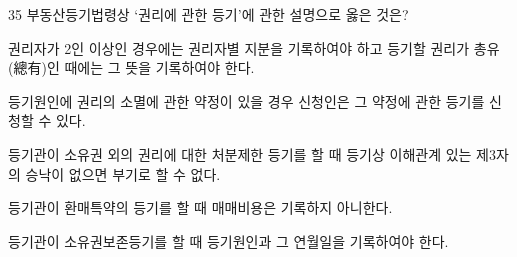 \begin{question}{35}
부동산등기법령상 ‘권리에 관한 등기’에 관한 설명으로 옳은 것은?
\begin{choices}
  \item 권리자가 2인 이상인 경우에는 권리자별 지분을 기록하여야 하고 등기할 권리가 총유(總有)인 때에는 그 뜻을 기록하여야 한다.
  \item 등기원인에 권리의 소멸에 관한 약정이 있을 경우 신청인은 그 약정에 관한 등기를 신청할 수 있다.
  \item 등기관이 소유권 외의 권리에 대한 처분제한 등기를 할 때 등기상 이해관계 있는 제3자의 승낙이 없으면 부기로 할 수 없다.
  \item 등기관이 환매특약의 등기를 할 때 매매비용은 기록하지 아니한다.
  \item 등기관이 소유권보존등기를 할 때 등기원인과 그 연월일을 기록하여야 한다.
\end{choices}
\end{question}
